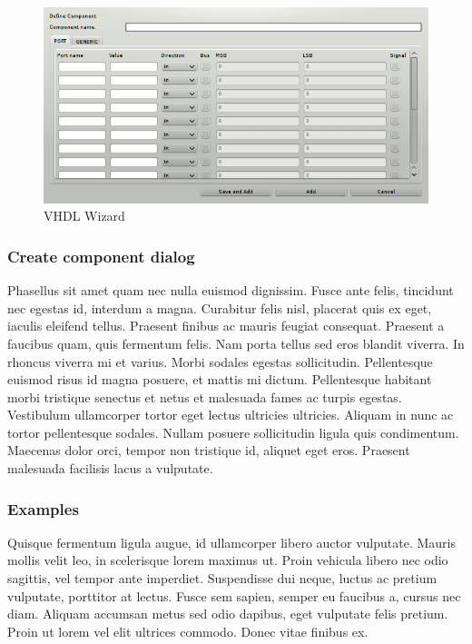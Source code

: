 \begin{figure}[h]
    \centering
    \includegraphics[width=.5\textwidth]{img/VHDL_create_component.png}
    \caption{VHDL Wizard}
\end{figure}


\subsubsection{Create component dialog}
    Phasellus sit amet quam nec nulla euismod dignissim. Fusce ante felis, tincidunt nec egestas id, interdum a magna. Curabitur felis nisl, placerat quis ex eget, iaculis eleifend tellus. Praesent finibus ac mauris feugiat consequat. Praesent a faucibus quam, quis fermentum felis. Nam porta tellus sed eros blandit viverra. In rhoncus viverra mi et varius. Morbi sodales egestas sollicitudin. Pellentesque euismod risus id magna posuere, et mattis mi dictum. Pellentesque habitant morbi tristique senectus et netus et malesuada fames ac turpis egestas. Vestibulum ullamcorper tortor eget lectus ultricies ultricies. Aliquam in nunc ac tortor pellentesque sodales. Nullam posuere sollicitudin ligula quis condimentum. Maecenas dolor orci, tempor non tristique id, aliquet eget eros. Praesent malesuada facilisis lacus a vulputate.

\subsubsection{Examples}
    Quisque fermentum ligula augue, id ullamcorper libero auctor vulputate. Mauris mollis velit leo, in scelerisque lorem maximus ut. Proin vehicula libero nec odio sagittis, vel tempor ante imperdiet. Suspendisse dui neque, luctus ac pretium vulputate, porttitor at lectus. Fusce sem sapien, semper eu faucibus a, cursus nec diam. Aliquam accumsan metus sed odio dapibus, eget vulputate felis pretium. Proin ut lorem vel elit ultrices commodo. Donec vitae finibus ex.